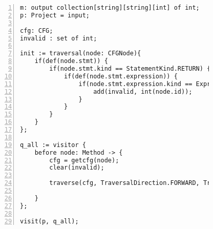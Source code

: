 \begin{figure}[ht!]
\begin{lstlisting}[numbers=left, tabsize=4, escapechar=@, caption={Useless increment in return statement},label={lst:uir-code}, lastline = 59] 
m: output collection[string][string][int] of int;
p: Project = input;

cfg: CFG;
invalid : set of int;

init := traversal(node: CFGNode){
	if(def(node.stmt)) {
		if(node.stmt.kind == StatementKind.RETURN) {
			if(def(node.stmt.expression)) {
				if(node.stmt.expression.kind == ExpressionKind.OP_INC) {
					add(invalid, int(node.id));
				}
			}
		}
	}
};

q_all := visitor {
	before node: Method -> {
		cfg = getcfg(node);
		clear(invalid);
		
		traverse(cfg, TraversalDirection.FORWARD, TraversalKind.HYBRID, init);
			
	}
};

visit(p, q_all);
\end{lstlisting}
\end{figure}